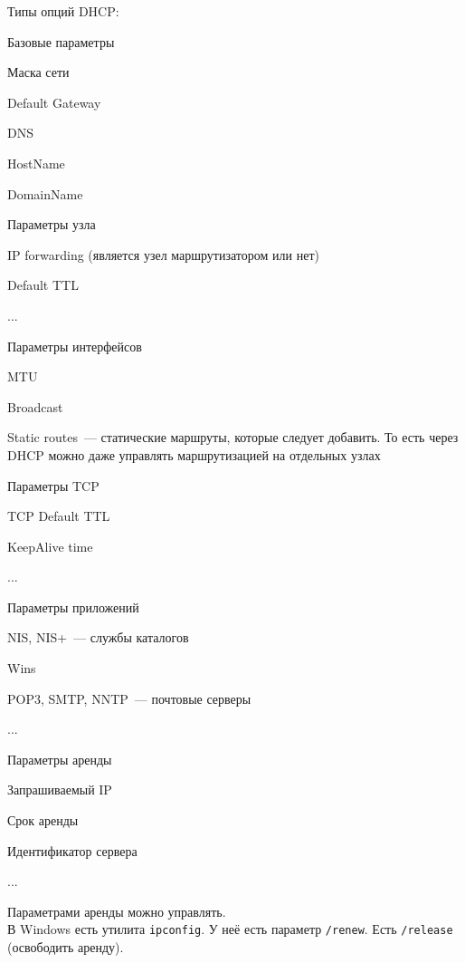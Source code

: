 Типы опций DHCP:
\begin{MyItemize}
    \item Базовые параметры
    \begin{MyItemize}
        \item Маска сети
        \item Default Gateway
        \item DNS
        \item HostName
        \item DomainName
    \end{MyItemize}
    \item Параметры узла
    \begin{MyItemize}
        \item IP forwarding (является узел маршрутизатором или нет)
        \item Default TTL
        \item ...
    \end{MyItemize}
    \item Параметры интерфейсов
    \begin{MyItemize}
        \item MTU
        \item Broadcast
        \item Static routes~--- статические маршруты, которые следует добавить. То есть через DHCP можно даже управлять маршрутизацией на отдельных узлах
    \end{MyItemize}
    \item Параметры TCP
    \begin{MyItemize}
        \item TCP Default TTL
        \item KeepAlive time
        \item ...
    \end{MyItemize}
    \item Параметры приложений
    \begin{MyItemize}
        \item NIS, NIS+~--- службы каталогов
        \item Wins
        \item POP3, SMTP, NNTP~--- почтовые серверы
        \item ...
    \end{MyItemize}
    \item Параметры аренды
    \begin{MyItemize}
        \item Запрашиваемый IP
        \item Срок аренды
        \item Идентификатор сервера
        \item ...
    \end{MyItemize}
    Параметрами аренды можно управлять.\\
    В Windows есть утилита {\tt ipconfig}. У неё есть параметр {\tt /renew}. Есть {\tt /release} (освободить аренду).
\end{MyItemize}

